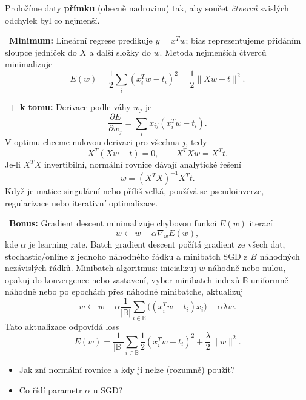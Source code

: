 \ucivo
\begin{intuice}
Proložíme daty \textbf{přímku} (obecně nadrovinu) tak, aby součet \emph{čtverců} svislých
odchylek byl co nejmenší.
\end{intuice}

\begin{center}
\end{center}

\begin{odpoved}
\setlength{\parskip}{2pt}
\noindent{}\ \textbf{Minimum:} Lineární regrese predikuje $y=x^Tw$; bias reprezentujeme přidáním sloupce jedniček do $X$ a další složky do $w$. Metoda nejmenších čtverců minimalizuje
\[
E(w)=\frac12\sum_i (x_i^Tw-t_i)^2
=\frac12\|Xw-t\|^2.
\]
\par
\noindent{}\ \textbf{+ k tomu:} Derivace podle váhy $w_j$ je
\[
\frac{\partial E}{\partial w_j}
=\sum_i x_{ij}(x_i^Tw-t_i).
\]
V optimu chceme nulovou derivaci pro všechna $j$, tedy
\[
X^T(Xw-t)=0,\qquad X^TXw=X^Tt.
\]
Je-li $X^TX$ invertibilní, normální rovnice dávají analytické řešení
\[
w=(X^TX)^{-1}X^Tt.
\]
Když je matice singulární nebo příliš velká, používá se pseudoinverze, regularizace nebo iterativní optimalizace.\par
\noindent{}\ \textbf{Bonus:} Gradient descent minimalizuje chybovou funkci $E(w)$ iterací
\[
w\leftarrow w-\alpha\nabla_wE(w),
\]
kde $\alpha$ je learning rate. Batch gradient descent počítá gradient ze všech dat, stochastic/online z jednoho náhodného řádku a minibatch SGD z $B$ náhodných nezávislých řádků. Minibatch algoritmus: inicializuj $w$ náhodně nebo nulou, opakuj do konvergence nebo zastavení, vyber minibatch indexů $\mathbb B$ uniformně náhodně nebo po epochách přes náhodné minibatche, aktualizuj
\[
w\leftarrow w-\alpha\frac1{|\mathbb B|}
\sum_{i\in\mathbb B}\bigl((x_i^Tw-t_i)x_i\bigr)-\alpha\lambda w.
\]
Tato aktualizace odpovídá loss
\[
E(w)=\frac1{|\mathbb B|}\sum_{i\in\mathbb B}\frac12(x_i^Tw-t_i)^2
+\frac\lambda2\|w\|^2.
\]
\end{odpoved}
\begin{recall}
\begin{itemize}[leftmargin=1.2em,itemsep=0pt,topsep=1pt]
  \item Jak zní normální rovnice a kdy ji nelze (rozumně) použít?
  \item Co řídí parametr $\alpha$ u SGD?
\end{itemize}
\end{recall}

